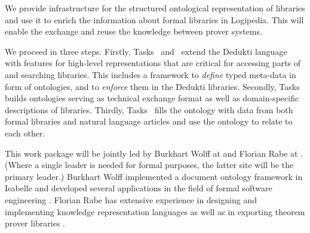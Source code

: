 \begin{workpackage}[id=structuring,type=RTD,wphases=1-48,
  short={Structure of the encyclopedia},%
  title={Structure of the encyclopedia},
  lead=FAU,
  wphases=1-48,
  SacRM=41,
  FauRM=20,
  BolRM=4
]



\begin{wpobjectives}
We provide infrastructure for the structured ontological representation of libraries and use it to enrich the information about formal libraries in Logipedia.
This will enable the exchange and reuse the knowledge between prover systems.
\end{wpobjectives}


\begin{wpdescription}
We proceed in three steps.
Firstly, Tasks~ and~ extend the Dedukti language with features for high-level representations that are critical for accessing parts of and searching libraries.
This includes a framework to \emph{define} typed meta-data in form of ontologies, and to \emph{enforce} them in 
the Dedukti libraries.
Secondly, Tasks~ builds ontologies serving as technical exchange format as well as domain-specific descriptions of libraries.
Thirdly, Tasks~ fills the ontology with data from both formal libraries and natural language articles and use the ontology to relate to each other.

This work package will be jointly led by Burkhart Wolff at  and Florian Rabe at .
(Where a single leader is needed for formal purposes, the latter site will be the primary leader.)
Burkhart Wolff implemented a document ontology framework in Isabelle and developed several applications
in the field of formal software engineering \cite{brucker.ea:ontologies-certification:2019,brucker.ea:isabelle-ontologies:2018,brucker.ea:ontologies-certification:2019}.
Florian Rabe has extensive experience in designing and implementing knowledge representation languages \cite{RK:mmt:10,rabe:recon:17} as well as in exporting theorem prover libraries \cite{KR:oafexp:20,CKMRSW:ulo:19}.
\end{wpdescription}


\end{workpackage}
